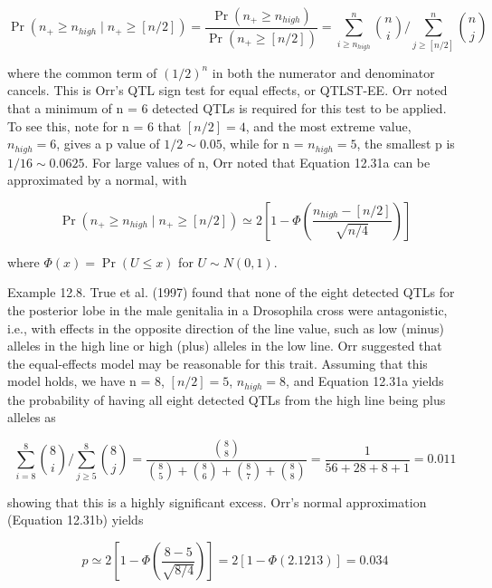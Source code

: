 \documentclass{article}
\begin{document}
\begin{equation}
\Pr(n_{+}\geq n_{high}\mid n_{+}\geq[n/2])=\frac{\Pr(n_{+}\geq n_{high})}{\Pr(n_{+}\geq[n/2])}=\sum_{i\geq n_{high}}^{n}\binom{n}{i}\bigg/\sum_{j\geq[n/2]}^{n}\binom{n}{j}
\tag{12.31a}
\label{eq:12_31a}
\end{equation}

where the common term of  $ (1/2)^n $ in both the numerator and denominator cancels. This is Orr's QTL sign test for equal effects, or QTLST-EE. Orr noted that a minimum of n = 6 detected QTLs is required for this test to be applied. To see this, note for n = 6 that  $ [n/2] = 4 $, and the most extreme value,  $ n_{high} = 6 $, gives a p value of  $ 1/2 \sim 0.05 $, while for n =  $ n_{high} = 5 $, the smallest p is  $ 1/16 \sim 0.0625 $. For large values of n, Orr noted that Equation 12.31a can be approximated by a normal, with

\begin{equation}
\Pr\left(n_{+}\geq n_{high}\mid n_{+}\geq[n/2]\right)\simeq2\left[1-\Phi\left(\frac{n_{high}-[n/2]}{\sqrt{n/4}}\right)\right]
\tag{12.31b}
\label{eq:12_31b}
\end{equation}

where  $ \Phi(x) = \Pr(U \leq x) $ for  $ U \sim N(0,1) $.

Example 12.8. True et al. (1997) found that none of the eight detected QTLs for the posterior lobe in the male genitalia in a Drosophila cross were antagonistic, i.e., with effects in the opposite direction of the line value, such as low (minus) alleles in the high line or high (plus) alleles in the low line. Orr suggested that the equal-effects model may be reasonable for this trait. Assuming that this model holds, we have n = 8,  $ [n/2] = 5 $,  $ n_{high} = 8 $, and Equation 12.31a yields the probability of having all eight detected QTLs from the high line being plus alleles as

\begin{equation}
\sum_{i=8}^{8}\binom{8}{i}\bigg/\sum_{j\geq5}^{8}\binom{8}{j}=\frac{\binom{8}{8}}{\binom{8}{5}+\binom{8}{6}+\binom{8}{7}+\binom{8}{8}}=\frac{1}{56+28+8+1}=0.011
\end{equation}

showing that this is a highly significant excess. Orr’s normal approximation (Equation 12.31b) yields

\begin{equation}
p\simeq2\left[1-\Phi\left(\frac{8-5}{\sqrt{8/4}}\right)\right]=2\left[1-\Phi\left(2.1213\right)\right]=0.034
\end{equation}
\end{document}
